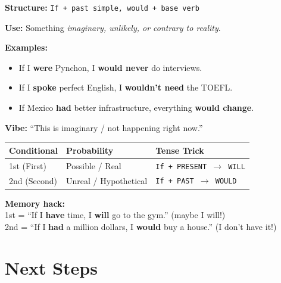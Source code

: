 \documentclass[11pt,a4paper]{article}
\begin{document}
\begin{tcolorbox}[colback=blue!5!white, colframe=blue!60!black, 
    title=\textbf{SECOND CONDITIONAL --- Unreal / Hypothetical / Unlikely}]
\textbf{Structure:} \texttt{If + past simple, would + base verb}

\textbf{Use:} Something \emph{imaginary, unlikely, or contrary to reality}.

\textbf{Examples:}
\begin{itemize}
    \item If I \textbf{were} Pynchon, I \textbf{would never} do interviews.
    \item If I \textbf{spoke} perfect English, I \textbf{wouldn't need} the TOEFL.
    \item If Mexico \textbf{had} better infrastructure, everything \textbf{would change}.
\end{itemize}

\textbf{Vibe:} ``This is imaginary / not happening right now.''
\end{tcolorbox}

\vspace{0.5cm}

\begin{tcolorbox}[colback=gray!5!white, colframe=black, 
    title=\textbf{TL;DR --- The Key Difference}]
\begin{center}
\begin{tabular}{|l|l|l|}
\hline
\textbf{Conditional} & \textbf{Probability} & \textbf{Tense Trick} \\
\hline
1st (First) & Possible / Real & \texttt{If + PRESENT $\rightarrow$ WILL} \\
\hline
2nd (Second) & Unreal / Hypothetical & \texttt{If + PAST $\rightarrow$ WOULD} \\
\hline
\end{tabular}
\end{center}

\textbf{Memory hack:} \\
1st = ``If I \textbf{have} time, I \textbf{will} go to the gym.'' (maybe I will!) \\
2nd = ``If I \textbf{had} a million dollars, I \textbf{would} buy a house.'' (I don't have it!)
\end{tcolorbox}

\section{Next Steps}
\end{document}
